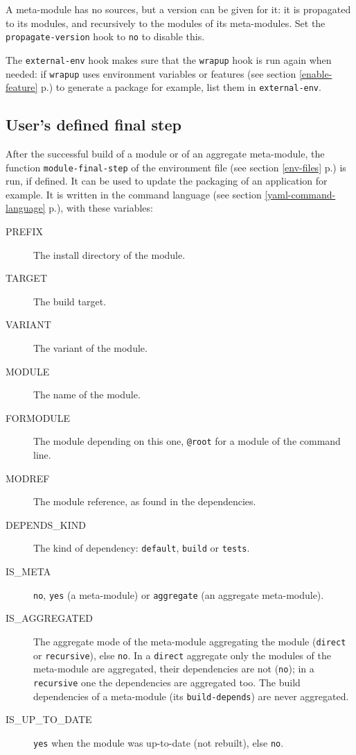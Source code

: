 \documentclass[a4paper,12pt,twoside]{article}
\newcommand{\code}[1]{\texttt{#1}}
\newcommand{\seeref}[1]{see section \ref{#1} p.\pageref{#1}}
\begin{document}
A meta-module has no sources, but a version can be given for it: it is propagated to its modules, and recursively to the modules of its meta-modules. Set the \code{propagate-version} hook to \code{no} to disable this.

The \code{external-env} hook makes sure that the \code{wrapup} hook is run again when needed: if \code{wrapup} uses environment variables or features (\seeref{enable-feature}) to generate a package for example, list them in \code{external-env}.

\subsection{User's defined final step}
\label{module-final-step}

After the successful build of a module or of an aggregate meta-module,
the function \code{module-final-step} of the environment file
(\seeref{env-files}) is run, if defined. It can be used to update the
packaging of an application for example. It is written in the command
language (\seeref{yaml-command-language}), with these variables:

\begin{description}
	\item [PREFIX] The install directory of the module.
	\item [TARGET] The build target.
	\item [VARIANT] The variant of the module.
	\item [MODULE] The name of the module.
	\item [FORMODULE] The module depending on this one, \code{@root} for a module of the command line.
	\item [MODREF] The module reference, as found in the dependencies.
	\item [DEPENDS\_KIND] The kind of dependency: \code{default}, \code{build} or \code{tests}.
	\item [IS\_META] \code{no}, \code{yes} (a meta-module) or \code{aggregate} (an aggregate meta-module).
	\item [IS\_AGGREGATED] The aggregate mode of the meta-module aggregating the module (\code{direct} or \code{recursive}), else \code{no}. In a \code{direct} aggregate only the modules of the meta-module are aggregated, their dependencies are not (\code{no}); in a \code{recursive} one the dependencies are aggregated too. The build dependencies of a meta-module (its \code{build-depends}) are never aggregated.
	\item [IS\_UP\_TO\_DATE] \code{yes} when the module was up-to-date (not rebuilt), else \code{no}.
\end{description}
\end{document}
